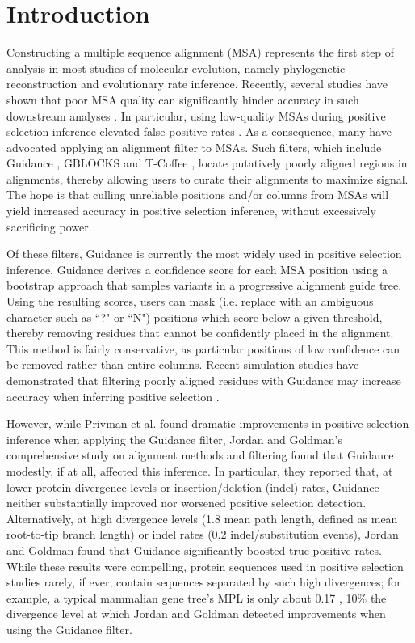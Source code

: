 \documentclass[10pt]{article}
\begin{document}
\section*{Introduction}
Constructing a multiple sequence alignment (MSA) represents the first step of analysis in most studies of molecular evolution, namely phylogenetic reconstruction and evolutionary rate inference. Recently, several studies have shown that poor MSA quality can significantly hinder accuracy in such downstream analyses \citep{Jordan2011, MarkovaRaina2011, Dwivedi2009, Talavera2007, Ogden2006}. In particular, using low-quality MSAs during positive selection inference elevated false positive rates \citep{Privman2012, Schneider2009, Fletcher2010}. As a consequence, many have advocated applying an alignment filter to MSAs. Such filters, which include Guidance \citep{Penn2010, Privman2012}, GBLOCKS \citep{Castresana2000} and T-Coffee \citep{Notredame2000}, locate putatively poorly aligned regions in alignments, thereby allowing users to curate their alignments to maximize signal. The hope is that culling unreliable positions and/or columns from MSAs will yield increased accuracy in positive selection inference, without excessively sacrificing power.

Of these filters, Guidance \citep{Penn2010} is currently the most widely used in positive selection inference. Guidance derives a confidence score for each MSA position using a bootstrap approach that samples variants in a progressive alignment guide tree. Using the resulting scores, users can mask (i.e. replace with an ambiguous character such as ``?" or ``N") positions which score below a given threshold, thereby removing residues that cannot be confidently placed in the alignment. This method is fairly conservative, as particular positions of low confidence can be removed rather than entire columns. Recent simulation studies have demonstrated that filtering poorly aligned residues with Guidance may increase accuracy when inferring positive selection \citep{Jordan2011,Privman2012}. 

However, while Privman et al. \citet{Privman2012} found dramatic improvements in positive selection inference when applying the Guidance filter, Jordan and Goldman's \citet{Jordan2011} comprehensive study on alignment methods and filtering found that Guidance modestly, if at all, affected this inference. In particular, they reported that, at lower protein divergence levels or insertion/deletion (indel) rates, Guidance neither substantially improved nor worsened positive selection detection. Alternatively, at high divergence levels (1.8 mean path length, defined as mean root-to-tip branch length) or indel rates (0.2 indel/substitution events), Jordan and Goldman found that Guidance significantly boosted true positive rates. While these results were compelling, protein sequences used in positive selection studies rarely, if ever, contain sequences separated by such high divergences; for example, a typical mammalian gene tree's MPL is only about 0.17 \citep{Spielman2013}, 10\% the divergence level at which Jordan and Goldman detected improvements when using the Guidance filter.
\end{document}
